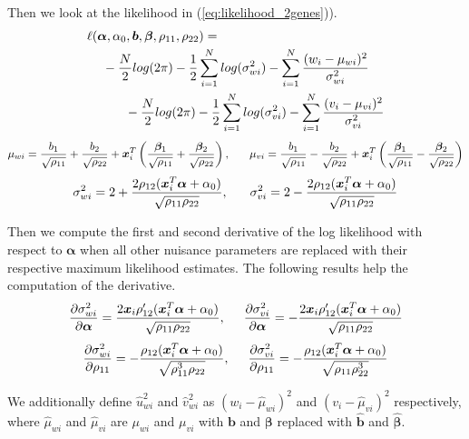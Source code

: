 \documentclass[aap,authoryear, preprint]{imsart}
\numberwithin{equation}{section}
\theoremstyle{plain}
\begin{document}
Then we look at the likelihood in (\ref{eq:likelihood_2genes})).
\begin{equation}
\begin{multlined}
\ell(\bm{\alpha}, \alpha_0, \bm{b}, \bm{\beta}, \rho_{11}, \rho_{22}) = \\
-\frac{N}{2} log(2\pi) - \frac{1}{2} \sum_{i=1}^{N} log (\sigma_{wi}^2) - \sum_{i=1}^{N} \frac{(w_i - \mu_{wi})^2}{\sigma_{wi}^2}\\
\hspace{7mm} -\frac{N}{2} log(2\pi) - \frac{1}{2} \sum_{i=1}^{N} log (\sigma_{vi}^2) - \sum_{i=1}^{N} \frac{(v_i - \mu_{vi})^2}{\sigma_{vi}^2}
\end{multlined}
    \label{eq:likelihood_2genes_appendix}
\end{equation}
$$\mu_{wi} = \frac{{b}_1}{\sqrt{\rho_{11}}} + \frac{{b}_2}{\sqrt{\rho_{22}}} + \bm{x}_i^T \left(\frac{\bm{\beta}_1}{\sqrt{\rho_{11}}} + \frac{\bm{\beta}_2}{\sqrt{\rho_{22}}}\right), \hspace{6mm} 
\mu_{vi} = \frac{{b}_1}{\sqrt{\rho_{11}}} - \frac{{b}_2}{\sqrt{\rho_{22}}} + \bm{x}_i^T \left(\frac{\bm{\beta}_1}{\sqrt{\rho_{11}}} - \frac{\bm{\beta}_2}{\sqrt{\rho_{22}}}\right)$$
$$\sigma_{wi}^2 = 2 + \frac{2\rho_{12}(\bm{x}_i^T\bm{\alpha} + \alpha_0)}{\sqrt{\rho_{11}\rho_{22}}}, \hspace{6mm} \sigma_{vi}^2 = 2 - \frac{2\rho_{12}(\bm{x}_i^T\bm{\alpha} + \alpha_0)}{\sqrt{\rho_{11}\rho_{22}}}$$

Then we compute the first and second derivative of the log likelihood with respect to $\bm{\alpha}$ when all other nuisance parameters are replaced with their respective maximum likelihood estimates. The following results help the computation of the derivative.
$$
\frac{\partial \sigma_{wi}^2}{\partial \bm{\alpha}} = \frac{2\bm{x}_i \rho_{12}'(\bm{x}_i^T \bm{\alpha} + \alpha_0)}{\sqrt{\rho_{11}\rho_{22}}}, \hspace{5mm}
\frac{\partial \sigma_{vi}^2}{\partial \bm{\alpha}} = -\frac{2\bm{x}_i \rho_{12}'(\bm{x}_i^T \bm{\alpha} + \alpha_0)}{\sqrt{\rho_{11}\rho_{22}}}
$$
$$\frac{\partial \sigma_{wi}^2}{\partial \rho_{11}} = -\frac{\rho_{12}(\bm{x}_i^T\bm{\alpha} + \alpha_0)}{\sqrt{\rho_{11}^3\rho_{22}}}, \hspace{5mm}
\frac{\partial \sigma_{vi}^2}{\partial \rho_{11}} = -\frac{\rho_{12}(\bm{x}_i^T\bm{\alpha} + \alpha_0)}{\sqrt{\rho_{11}\rho_{22}^3}}$$

\noindent We additionally define $\hat{u}_{wi}^2$ and $\hat{v}_{wi}^2$ as $(w_i - \hat{\mu}_{wi})^2$ and $(v_i-\hat{\mu}_{vi})^2$ respectively, where $\hat{\mu}_{wi}$ and $\hat{\mu}_{vi}$ are $\mu_{wi}$ and $\mu_{vi}$ with $\bm{b}$ and $\bm{\beta}$ replaced with $\hat{\bm{b}}$ and $\hat{\bm{\beta}}$.\\
\end{document}
